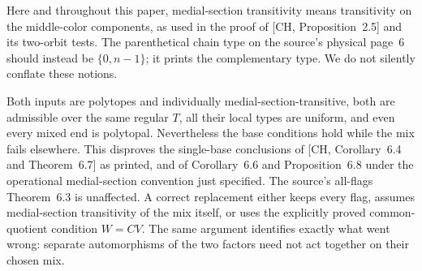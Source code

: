 Here and throughout this paper, medial-section transitivity means
transitivity on the middle-color components, as used in the proof of
[CH, Proposition~2.5] and its two-orbit tests. The parenthetical chain
type on the source's physical page~6 should instead be $\{0,n-1\}$;
it prints the complementary type. We do not silently conflate these
notions.

Both inputs are polytopes and individually medial-section-transitive,
both are admissible over the same regular $T$, all their local types
are uniform, and even every mixed end is polytopal. Nevertheless the
base conditions hold while the mix fails elsewhere. This disproves the
single-base conclusions of [CH, Corollary~6.4 and Theorem~6.7] as
printed, and of Corollary~6.6 and Proposition~6.8 under the operational
medial-section convention just specified. The source's all-flags Theorem~6.3
is unaffected. A correct replacement either keeps every flag, assumes
medial-section transitivity of the mix itself, or uses the explicitly
proved common-quotient condition $W=CV$. The same argument identifies
exactly what went wrong: separate automorphisms of the two factors need
not act together on their chosen mix.
